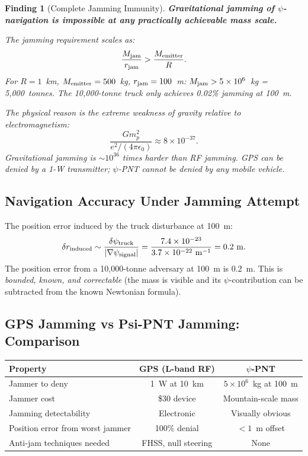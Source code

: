 \documentclass[aps,prd,twocolumn,superscriptaddress,nofootinbib]{revtex4-2}
\newtheorem{finding}{Finding}
\begin{document}
\begin{finding}[Complete Jamming Immunity]
\label{find:jamming}
\textbf{Gravitational jamming of $\psi$-navigation is impossible at any
practically achievable mass scale.}

The jamming requirement scales as:
\begin{equation}
\frac{M_{\rm jam}}{r_{\rm jam}} > \frac{M_{\rm emitter}}{R}.
\label{eq:jam-scaling}
\end{equation}
For $R = 1$~km, $M_{\rm emitter} = 500$~kg, $r_{\rm jam} = 100$~m:
$M_{\rm jam} > 5\times10^6$~kg = 5,000~tonnes.  The 10,000-tonne
truck only achieves 0.02\% jamming at 100~m.

The physical reason is the extreme weakness of gravity relative to
electromagnetism:
\begin{equation}
\frac{Gm_p^2}{e^2/(4\pi\epsilon_0)} \approx 8\times10^{-37}.
\label{eq:gravity-EM-ratio}
\end{equation}
Gravitational jamming is $\sim 10^{36}$ times harder than RF jamming.
GPS can be denied by a 1-W transmitter; $\psi$-PNT cannot be denied
by any mobile vehicle.
\end{finding}

\subsection{Navigation Accuracy Under Jamming Attempt}

The position error induced by the truck disturbance at 100~m:
\begin{equation}
\delta r_{\rm induced} \sim \frac{\delta\psi_{\rm truck}}{|\nabla\psi_{\rm signal}|}
= \frac{7.4\times10^{-23}}{3.7\times10^{-22}~\mathrm{m}^{-1}} = 0.2~\mathrm{m}.
\end{equation}
The position error from a 10,000-tonne adversary at 100~m is 0.2~m.
This is \emph{bounded, known, and correctable} (the mass is visible and
its $\psi$-contribution can be subtracted from the known Newtonian formula).

\subsection{GPS Jamming vs Psi-PNT Jamming: Comparison}

\begin{center}
\begin{tabular}{lcc}
\toprule
Property & GPS (L-band RF) & $\psi$-PNT \\
\midrule
Jammer to deny & 1~W at 10~km & $5\times10^6$~kg at 100~m \\
Jammer cost & \$30 device & Mountain-scale mass \\
Jamming detectability & Electronic & Visually obvious \\
Position error from worst jammer & 100\% denial & $<1$~m offset \\
Anti-jam techniques needed & FHSS, null steering & None \\
\bottomrule
\end{tabular}
\end{center}
\end{document}
